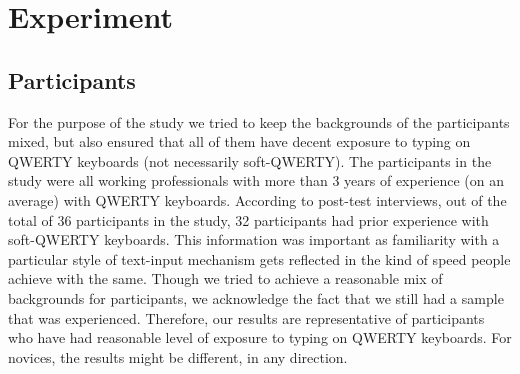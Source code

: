 \section{Experiment}
\subsection{Participants}
For the purpose of the study we tried to keep the backgrounds of the participants mixed, but also ensured that all of them have decent exposure to typing on QWERTY keyboards (not necessarily soft-QWERTY). The participants in the study were all working professionals with more than 3 years of experience (on an average) with QWERTY keyboards. According to post-test interviews, out of the total of 36 participants in the study, 32 participants had prior experience with soft-QWERTY keyboards. This information was important as familiarity with a particular style of text-input mechanism gets reflected in the kind of speed people achieve with the same. Though we tried to achieve a reasonable mix of backgrounds for participants, we acknowledge the fact that we still had a sample that was experienced. Therefore, our results are representative of participants who have had reasonable level of exposure to typing on QWERTY keyboards. For novices, the results might be different, in any direction.
